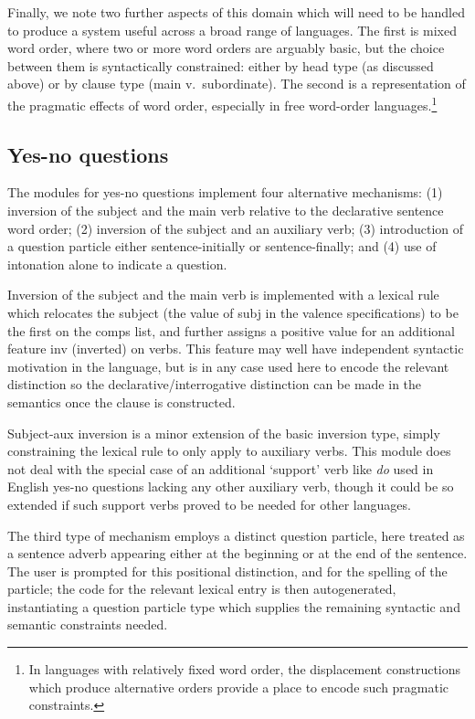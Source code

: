 Finally, we note two further aspects of this domain which will need
to be handled to produce a system useful across a broad range of
languages.  The first is mixed word order, where two or more word
orders are arguably basic, but the choice between them is syntactically
constrained: either by head type (as discussed above) or by clause
type (main v.\ subordinate).  The second is a representation of the
pragmatic effects of word order, especially in free word-order
languages.\footnote{In languages with relatively fixed word order, the
displacement constructions which produce alternative orders provide a
place to encode such pragmatic constraints.}


\subsection{Yes-no questions}

The modules for yes-no questions implement four alternative mechanisms:
(1) inversion of the subject and the main verb relative to the declarative
sentence word order; (2) inversion of the subject and an auxiliary
verb; (3) introduction of a question particle either sentence-initially or
sentence-finally; and (4) use of intonation alone to indicate a question.

Inversion of the subject and the main verb is implemented with a lexical
rule which relocates the subject (the value of {\sc subj} in the valence
specifications) to be the first on the {\sc comps} list, and further
assigns a positive value for an additional feature {\sc inv} (inverted)
on verbs.  This feature may well have independent syntactic motivation in 
the language, but is in any case used here to encode the relevant distinction
so the declarative/interrogative distinction can be made in the semantics
once the clause is constructed.

Subject-aux inversion is a minor extension of the basic inversion type,
simply constraining the lexical rule to only apply to auxiliary verbs.
This module does not deal with the special case of an additional `support'
verb like {\it do} used in English yes-no questions lacking any other
auxiliary verb, though it could be so extended if such support verbs
proved to be needed for other languages.

The third type of mechanism employs a distinct question particle, here
treated as a sentence adverb appearing either at the beginning or at the
end of the sentence.  The user is prompted for this positional distinction,
and for the spelling of the particle; the code for the relevant lexical
entry is then autogenerated, instantiating a question particle type which
supplies the remaining syntactic and semantic constraints needed.

